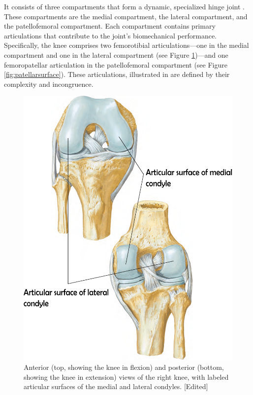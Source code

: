 \documentclass{micro-econ-thesis}
\begin{document}
 
It consists of three compartments that form a dynamic, specialized hinge joint \parencite[p.1395]{standring_grays_2021}. These compartments are the medial compartment, the lateral compartment, and the patellofemoral compartment.
Each compartment contains primary articulations that contribute to the joint's biomechanical performance. Specifically, the knee comprises two femorotibial articulations—one in the medial compartment and one in the lateral compartment (see Figure \ref{fig:rightkneeplate519})—and one femoropatellar articulation in the patellofemoral compartment (see Figure \ref{fig:patellarsurface}).  These articulations, illustrated in  are defined by their complexity and incongruence. 
 
\begin{figure}[H]
	\centering
	\includegraphics[scale=0.3]{right_knee_labeled}
	\caption{Anterior (top, showing the knee in flexion) and posterior (bottom, showing the knee in extension) views of the right knee, with labeled articular surfaces of the medial and lateral condyles. [Edited] \parencite[p.519]{netter_519_2023}}
	\label{fig:rightkneeplate519}
\end{figure}
\end{document}
